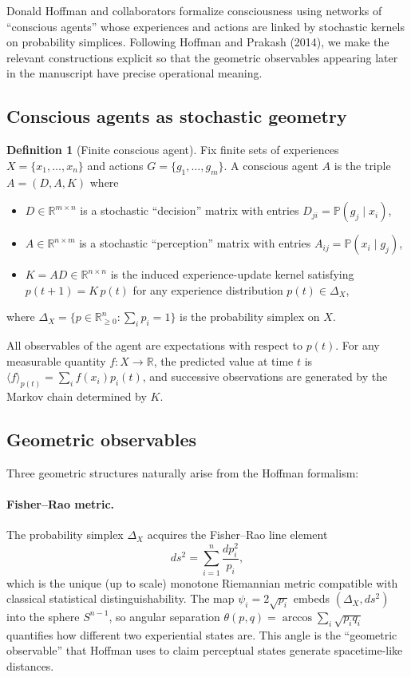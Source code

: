 \documentclass[12pt,a4paper]{article}
\theoremstyle{definition}
\newtheorem{definition}{Definition}[section]
\begin{document}
Donald Hoffman and collaborators formalize consciousness using networks of ``conscious agents'' whose experiences and actions are linked by stochastic kernels on probability simplices. Following Hoffman and Prakash (2014)\cite{HoffmanPrakash2014}, we make the relevant constructions explicit so that the geometric observables appearing later in the manuscript have precise operational meaning.

\subsection{Conscious agents as stochastic geometry}

\begin{definition}[Finite conscious agent]
Fix finite sets of experiences $X = \{x_1,\dots,x_n\}$ and actions $G = \{g_1,\dots,g_m\}$. A conscious agent $A$ is the triple $A = (D, A, K)$ where
\begin{itemize}
    \item $D \in \mathbb{R}^{m \times n}$ is a stochastic ``decision'' matrix with entries $D_{j i} = \mathbb{P}(g_j \mid x_i)$,
    \item $A \in \mathbb{R}^{n \times m}$ is a stochastic ``perception'' matrix with entries $A_{i j} = \mathbb{P}(x_i \mid g_j)$,
    \item $K = A D \in \mathbb{R}^{n \times n}$ is the induced experience-update kernel satisfying $p(t+1) = K \, p(t)$ for any experience distribution $p(t) \in \Delta_X$,
\end{itemize}
where $\Delta_X = \{p \in \mathbb{R}_{\ge 0}^n : \sum_i p_i = 1\}$ is the probability simplex on $X$.
\end{definition}

All observables of the agent are expectations with respect to $p(t)$. For any measurable quantity $f : X \rightarrow \mathbb{R}$, the predicted value at time $t$ is $\langle f \rangle_{p(t)} = \sum_i f(x_i) p_i(t)$, and successive observations are generated by the Markov chain determined by $K$.

\subsection{Geometric observables}

Three geometric structures naturally arise from the Hoffman formalism\cite{KemenySnell1976}:

\paragraph{Fisher--Rao metric.} The probability simplex $\Delta_X$ acquires the Fisher--Rao line element
\begin{equation}
ds^2 = \sum_{i=1}^n \frac{dp_i^2}{p_i},
\end{equation}
which is the unique (up to scale) monotone Riemannian metric compatible with classical statistical distinguishability. The map $\psi_i = 2\sqrt{p_i}$ embeds $(\Delta_X, ds^2)$ into the sphere $S^{n-1}$, so angular separation $\theta(p,q) = \arccos \sum_i \sqrt{p_i q_i}$ quantifies how different two experiential states are. This angle is the ``geometric observable'' that Hoffman uses to claim perceptual states generate spacetime-like distances.
\end{document}
